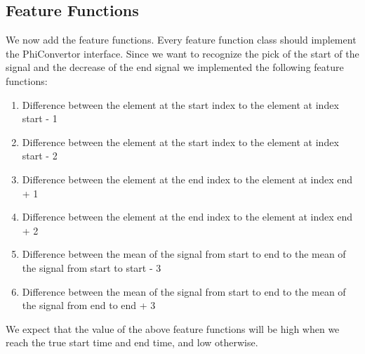 \documentclass[11pt, oneside]{article}   	%
\begin{document}
\subsection{Feature Functions}
We now add the feature functions. Every feature function class should implement the PhiConvertor interface. Since we want to recognize the pick of the start of the signal  and the decrease of the end signal we implemented the following feature functions:

\begin{enumerate}
  \item Difference between the element at the start index to the element at index start - 1
  \item Difference between the element at the start index to the element at index start - 2
  \item Difference between the element at the end index to the element at index end + 1
  \item Difference between the element at the end index to the element at index end + 2
  \item Difference between the mean of the signal from start to end to the mean of the signal from start to start - 3
  \item Difference between the mean of the signal from start to end to the mean of the signal from end to end + 3
\end{enumerate}

We expect that the value of the above feature functions will be high when we reach the true start time and end time, and low otherwise.
\end{document}
